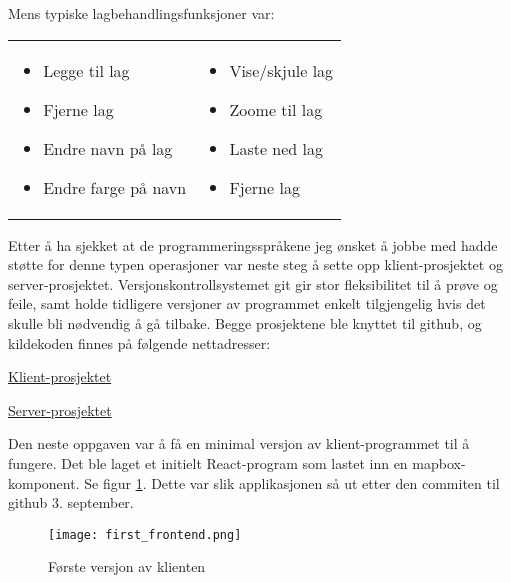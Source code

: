 Mens typiske lagbehandlingsfunksjoner var:

\begin{frame}

    \begin{tabular}{p{}p{}}

        \begin{itemize}
            \item Legge til lag
            \item Fjerne lag
            \item Endre navn på lag
            \item Endre farge på navn
        \end{itemize} &

        \begin{itemize}
            \item Vise/skjule lag
            \item Zoome til lag
            \item Laste ned lag
            \item Fjerne lag
        \end{itemize}
    \end{tabular}

\end{frame}

Etter å ha sjekket at de programmeringsspråkene jeg ønsket å jobbe med hadde støtte for denne typen operasjoner var neste steg å sette opp klient-prosjektet og server-prosjektet. Versjonskontrollsystemet git gir stor fleksibilitet til å prøve og feile, samt holde tidligere versjoner av programmet enkelt tilgjengelig hvis det skulle bli nødvendig å gå tilbake. Begge prosjektene ble knyttet til github, og kildekoden finnes på følgende nettadresser:

\href{https://github.com/torsol/PiG-frontend}{Klient-prosjektet}

\href{https://github.com/torsol/PiG-backend}{Server-prosjektet}

Den neste oppgaven var å få en minimal versjon av klient-programmet til å fungere. Det ble laget et initielt React-program som lastet inn en mapbox-komponent. Se figur \ref{fig:firstmap}. Dette var slik applikasjonen så ut etter den commiten til github 3. september.

\begin{figure}[h]
    \center
    \texttt{[image: first\_frontend.png]}
    \caption{Første versjon av klienten}
    \label{fig:firstmap}
\end{figure}

